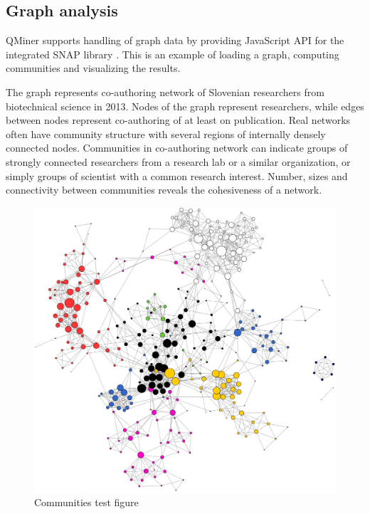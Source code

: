 \documentclass{article} %
\begin{document}
\subsection{Graph analysis}

QMiner supports handling of graph data by providing JavaScript API for the integrated SNAP library \cite{snap}.
This is an example of loading a graph, computing communities and visualizing the results.

The graph represents co-authoring network of Slovenian researchers from biotechnical science in 2013. Nodes of the graph represent researchers, while edges between nodes represent co-authoring of at least on publication. Real networks often have community structure with several regions of internally densely connected nodes. Communities in co-authoring network can indicate groups of strongly connected researchers from a research lab or a similar organization, or simply groups of scientist with a common research interest. Number, sizes and connectivity between communities reveals the cohesiveness of a network.

\begin{figure}[h]
\begin{center}
\includegraphics[scale=0.25]{communitiestest.jpg}
\caption{Communities test figure}
\end{center}
\end{figure}
\end{document}
